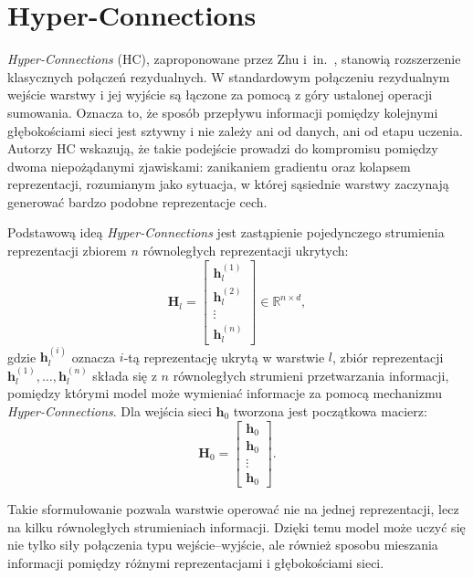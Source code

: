 \section{Hyper-Connections}

\textit{Hyper-Connections} (HC), zaproponowane przez Zhu i~in.~\cite{hyperconnections2024},
stanowią rozszerzenie klasycznych połączeń rezydualnych. W standardowym połączeniu
rezydualnym wejście warstwy i jej wyjście są łączone za pomocą z góry ustalonej operacji
sumowania. Oznacza to, że sposób przepływu informacji pomiędzy kolejnymi głębokościami
sieci jest sztywny i nie zależy ani od danych, ani od etapu uczenia. Autorzy HC wskazują,
że takie podejście prowadzi do kompromisu pomiędzy dwoma niepożądanymi zjawiskami:
zanikaniem gradientu oraz kolapsem reprezentacji, rozumianym jako sytuacja, w której
sąsiednie warstwy zaczynają generować bardzo podobne reprezentacje cech.

Podstawową ideą \textit{Hyper-Connections} jest zastąpienie pojedynczego strumienia
reprezentacji zbiorem \(n\) równoległych reprezentacji ukrytych:
\begin{equation}
	\mathbf{H}_l =
	\begin{bmatrix}
		\mathbf{h}_l^{(1)} \\
		\mathbf{h}_l^{(2)} \\
		\vdots \\
		\mathbf{h}_l^{(n)}
	\end{bmatrix}
	\in \mathbb{R}^{n \times d},
\end{equation}
gdzie \(\mathbf{h}_l^{(i)}\) oznacza \(i\)-tą reprezentację ukrytą w warstwie \(l\),
zbiór reprezentacji \(\mathbf{h}_l^{(1)}, \dots, \mathbf{h}_l^{(n)}\) składa się z \(n\) równoległych strumieni przetwarzania informacji, pomiędzy którymi model
może wymieniać informacje za pomocą mechanizmu \textit{Hyper-Connections}. Dla wejścia sieci \(\mathbf{h}_0\) tworzona jest początkowa macierz:
\begin{equation}
	\mathbf{H}_0 =
	\begin{bmatrix}
		\mathbf{h}_0 \\
		\mathbf{h}_0 \\
		\vdots \\
		\mathbf{h}_0
	\end{bmatrix}.
\end{equation}

Takie sformułowanie pozwala warstwie operować nie na jednej reprezentacji, lecz na kilku
równoległych strumieniach informacji. Dzięki temu model może uczyć się nie tylko siły
połączenia typu wejście--wyjście, ale również sposobu mieszania informacji pomiędzy
różnymi reprezentacjami i głębokościami sieci.

